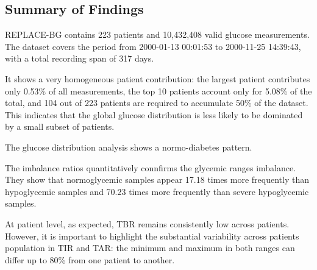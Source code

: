 \subsection{Summary of Findings}
\label{subsec:replacebg_summary}

REPLACE-BG contains 223 patients and 10,432,408 valid glucose measurements. The dataset covers the period from 2000-01-13 00:01:53 to 2000-11-25 14:39:43, with a total recording span of 317 days.

It shows a very homogeneous patient contribution: the largest patient contributes only 0.53\% of all measurements, the top 10 patients account only for 5.08\% of the total, and 104 out of 223 patients are required to accumulate 50\% of the dataset. This indicates that the global glucose distribution is less likely to be dominated by a small subset of patients.

The glucose distribution analysis shows a normo-diabetes pattern.

The imbalance ratios quantitatively connfirms the glycemic ranges imbalance. They show that normoglycemic samples appear 17.18 times more frequently than hypoglycemic samples and 70.23 times more frequently than severe hypoglycemic samples.

At patient level, as expected, TBR remains consistently low across patients. However, it is important to highlight the substantial variability across patients population in TIR and TAR: the minimum and maximum in both ranges can differ up to 80\% from one patient to another.